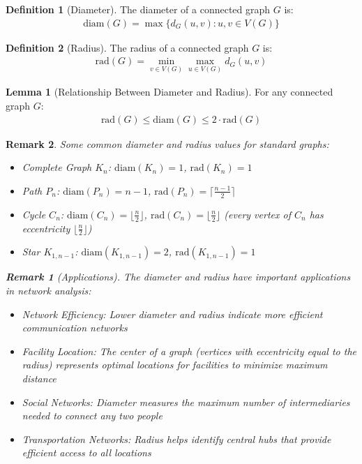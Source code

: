 \documentclass{article}
\newtheorem{remark}{Remark}
\theoremstyle{definition}
\newtheorem{lemma}{Lemma}
\newtheorem{definition}{Definition}
\begin{document}
\begin{definition}[Diameter]
The diameter of a connected graph $G$ is:
\begin{align*}
\text{diam}(G) = \max\{d_G(u,v) : u,v \in V(G)\}
\end{align*}
\end{definition}

\begin{definition}[Radius]
The radius of a connected graph $G$ is:
\begin{align*}
\text{rad}(G) = \min_{v \in V(G)} \max_{u \in V(G)} d_G(u,v)
\end{align*}
\end{definition}


\begin{lemma}[Relationship Between Diameter and Radius]
For any connected graph $G$:
\begin{align*}
\text{rad}(G) \leq \text{diam}(G) \leq 2 \cdot \text{rad}(G)
\end{align*}
\end{lemma}

\begin{remark}
Some common diameter and radius values for standard graphs:
\begin{itemize}
    \item Complete Graph $K_n$: $\text{diam}(K_n) = 1$, $\text{rad}(K_n) = 1$
    \item Path $P_n$: $\text{diam}(P_n) = n-1$, $\text{rad}(P_n) = \lceil\frac{n-1}{2}\rceil$
    \item Cycle $C_n$: $\text{diam}(C_n) = \lfloor\frac{n}{2}\rfloor$, $\text{rad}(C_n) = \lfloor\frac{n}{2}\rfloor$ (every vertex of $C_n$ has eccentricity $\lfloor\frac{n}{2}\rfloor$)
    \item Star $K_{1,n-1}$: $\text{diam}(K_{1,n-1}) = 2$, $\text{rad}(K_{1,n-1}) = 1$
\end{itemize}
\begin{remark}[Applications]
The diameter and radius have important applications in network analysis:
\begin{itemize}
    \item Network Efficiency: Lower diameter and radius indicate more efficient communication networks
    \item Facility Location: The center of a graph (vertices with eccentricity equal to the radius) represents optimal locations for facilities to minimize maximum distance
    \item Social Networks: Diameter measures the maximum number of intermediaries needed to connect any two people
    \item Transportation Networks: Radius helps identify central hubs that provide efficient access to all locations
\end{itemize}
\end{remark}
\end{remark}
\end{document}
